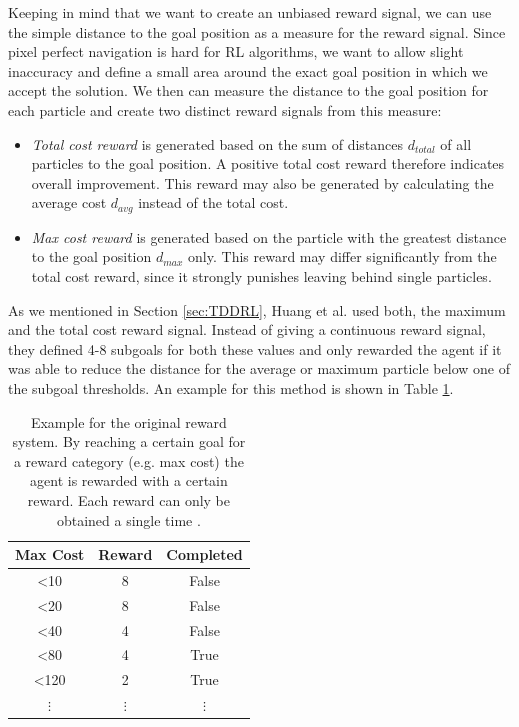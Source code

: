 Keeping in mind that we want to create an unbiased reward signal, we can use the simple distance to the goal position as a measure for the reward signal. Since pixel perfect navigation is hard for RL algorithms, we want to allow slight inaccuracy and define a small area around the exact goal position in which we accept the solution. We then can measure the distance to the goal position for each particle and create two distinct reward signals from this measure:

\begin{itemize}
    \item \textit{Total cost reward} is generated based on the sum of distances $d_{total}$ of all particles to the goal position. A positive total cost reward therefore indicates overall improvement. This reward may also be generated by calculating the average cost $d_{avg}$ instead of the total cost.
    \item \textit{Max cost reward} is generated based on the particle with the greatest distance to the goal position $d_{max}$ only. This reward may differ significantly from the total cost reward, since it strongly punishes leaving behind single particles. 
\end{itemize}

As we mentioned in Section \ref{sec:TDDRL}, Huang et al. used both, the maximum and the total cost reward signal. Instead of giving a continuous reward signal, they defined 4-8 subgoals for both these values and only rewarded the agent if it was able to reduce the distance for the average or maximum particle below one of the subgoal thresholds. An example for this method is shown in Table \ref{tab:OriginalRewards}.

\begin{table} [ht]
    \begin{center}
        \begin{tabular}{|c|c|c|}
            \hline
            Max Cost & Reward & Completed \\
            \hline
            <10 & 8 & False \\
            <20 & 8 & False \\
            <40 & 4 & False \\
            <80 & 4 & True \\
            <120 & 2 & True \\
            $\vdots$ & $\vdots$ & $\vdots$ \\
            \hline
        \end{tabular}
    \end{center}
    \caption[Original Reward Example]{Example for the original reward system. By reaching a certain goal for a reward category (e.g. max cost) the agent is rewarded with a certain reward. Each reward can only be obtained a single time \cite{huang2019}.} \label{tab:OriginalRewards}
\end{table}


